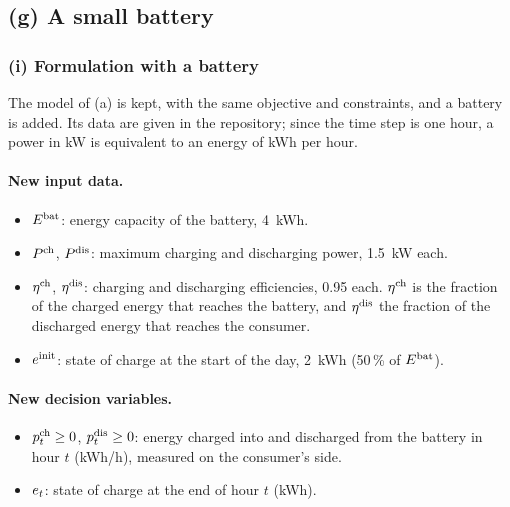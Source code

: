 \subsection{(g) A small battery}

\subsubsection{(i) Formulation with a battery}
The model of (a) is kept, with the same objective and constraints, and a battery is added. Its
data are given in the repository; since the time step is one hour, a power in kW is
equivalent to an energy of kWh per hour.

\paragraph{New input data.}
\begin{itemize}
    \item $E^{\mathrm{bat}}$: energy capacity of the battery, 4~kWh.
    \item $P^{\mathrm{ch}}$, $P^{\mathrm{dis}}$: maximum charging and discharging power, 1.5~kW each.
    \item $\eta^{\mathrm{ch}}$, $\eta^{\mathrm{dis}}$: charging and discharging efficiencies, 0.95 each. $\eta^{\mathrm{ch}}$ is the
    fraction of the charged energy that reaches the battery, and $\eta^{\mathrm{dis}}$ the fraction of the
    discharged energy that reaches the consumer.
    \item $e^{\mathrm{init}}$: state of charge at the start of the day, 2~kWh (50\,\% of $E^{\mathrm{bat}}$).
\end{itemize}

\paragraph{New decision variables.}
\begin{itemize}
    \item $p^{\mathrm{ch}}_{t} \geq 0$, $p^{\mathrm{dis}}_{t} \geq 0$: energy charged into and discharged from the battery in
    hour $t$ (kWh/h), measured on the consumer's side.
    \item $e_{t}$: state of charge at the end of hour $t$ (kWh).
\end{itemize}

